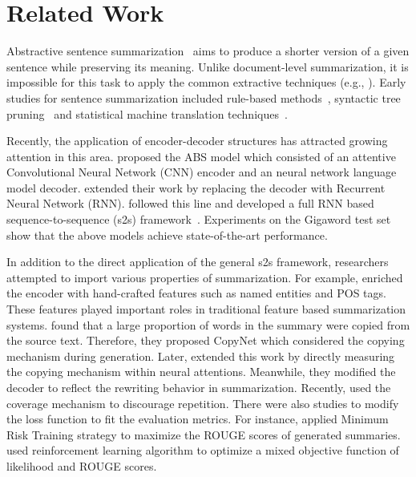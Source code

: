 \documentclass[letterpaper]{article} \usepackage{aaai18}  \usepackage{times}  \usepackage{helvet}  \usepackage{courier}  \usepackage{url}  \usepackage{graphicx}  \usepackage{amsfonts}
\begin{document}
	
\section{Related Work}
	Abstractive sentence summarization~\cite{chopra2016abstractive} aims to produce a shorter version of a given sentence while preserving its meaning.
Unlike document-level summarization, it is impossible for this task to apply the common extractive techniques (e.g., \cite{cao2015ranking,cao2015learning}).
	Early studies for sentence summarization included rule-based methods~\cite{zajic2007multi}, syntactic tree pruning~\cite{knight2002summarization} and statistical machine translation techniques~\cite{banko2000headline}. 
	
	Recently, the application of encoder-decoder structures has attracted growing attention in this area.
	\cite{rush2015neural} proposed the ABS model which consisted of an attentive Convolutional Neural Network (CNN) encoder and an neural network language model decoder.
	\cite{chopra2016abstractive} extended their work by replacing the decoder with Recurrent Neural Network (RNN).
	\cite{nallapati2016abstractive} followed this line and developed a full RNN based sequence-to-sequence (s2s) framework~\cite{sutskever2014sequence}.
Experiments on the Gigaword test set~\cite{rush2015neural} show that the above models achieve state-of-the-art performance.
	
	In addition to the direct application of the general s2s framework, researchers attempted to import various properties of summarization.
	For example, \cite{nallapati2016abstractive} enriched the encoder with hand-crafted features such as named entities and POS tags.
	These features played important roles in traditional feature based summarization systems.
	\cite{gu2016incorporating} found that a large proportion of words in the summary were copied from the source text.
	Therefore, they proposed CopyNet which considered the copying mechanism during generation.
	Later, \cite{ziqiang2017rnn} extended this work by directly measuring the copying mechanism within neural attentions.
	Meanwhile, they modified the decoder to reflect the rewriting behavior in summarization.
	Recently, \cite{see2017get} used the coverage mechanism to discourage repetition.
	There were also studies to modify the loss function to fit the evaluation metrics.
	For instance, \cite{ayana2016neural} applied Minimum Risk Training strategy to maximize the ROUGE scores of generated summaries.
	\cite{paulus2017deep} used reinforcement learning algorithm to optimize a mixed objective function of likelihood and ROUGE scores.
	
\end{document}
